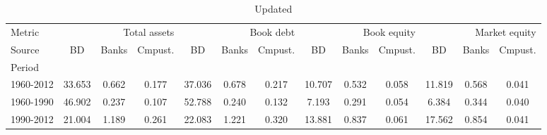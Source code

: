 
    \begin{table}[htbp]
      \centering
      \caption{Updated}
      \label{tab:Table 2}
      \small
      \begin{tabular}{lcccccccccccc}
\toprule
Metric & \multicolumn{3}{r}{Total assets} & \multicolumn{3}{r}{Book debt} & \multicolumn{3}{r}{Book equity} & \multicolumn{3}{r}{Market equity} \\
Source & BD & Banks & Cmpust. & BD & Banks & Cmpust. & BD & Banks & Cmpust. & BD & Banks & Cmpust. \\
Period &  &  &  &  &  &  &  &  &  &  &  &  \\
\midrule
1960-2012 & 33.653 & 0.662 & 0.177 & 37.036 & 0.678 & 0.217 & 10.707 & 0.532 & 0.058 & 11.819 & 0.568 & 0.041 \\
1960-1990 & 46.902 & 0.237 & 0.107 & 52.788 & 0.240 & 0.132 & 7.193 & 0.291 & 0.054 & 6.384 & 0.344 & 0.040 \\
1990-2012 & 21.004 & 1.189 & 0.261 & 22.083 & 1.221 & 0.320 & 13.881 & 0.837 & 0.061 & 17.562 & 0.854 & 0.041 \\
\bottomrule
\end{tabular}

    \end{table}
    